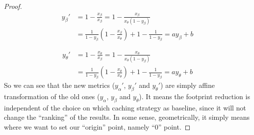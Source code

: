 \documentclass{sigcomm-alternate}
\begin{document}
\begin{proof}
\begin{align}
  y_{\beta}' & = 1 - \frac{x_{\beta}}{x_{\beta}} = 1 - \frac{x_{\beta}}{x_{\theta}(1 - y_{\beta})} \\
  & = \frac{1}{1-y_{\beta}} (1 - \frac{x_{\beta}}{x_{\theta}}) + 1 - \frac{1}{1-y_{\beta}} = a y_{\beta} + b \label{eq:8}
\end{align}

\begin{align}
  y_{\theta}' & = 1 - \frac{x_{\theta}}{x_{\beta}} = 1 - \frac{x_{\theta}}{x_{\theta}(1 - y_{\beta})} \\
  & = \frac{1}{1-y_{\beta}} (1 - \frac{x_{\theta}}{x_{\theta}}) + 1 - \frac{1}{1-y_{\beta}} = a y_{\theta} + b \label{eq:9}
\end{align}
So we can see that the new metrics ($y_{\alpha}'$, $y_{\beta}'$ and
$y_{\theta}'$) are simply affine transformation of the old ones
($y_{\alpha}$, $y_{\beta}$ and $y_{\theta}$). It means the footprint
reduction is independent of the choice on which caching strategy as
baseline, since it will not change the ``ranking'' of the results.  In
some sense, geometrically, it simply means where we want to set our
``origin'' point, namely ``0'' point.
\end{proof}
\end{document}
